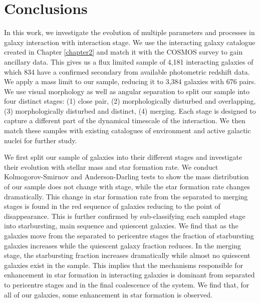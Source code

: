\section{Conclusions}\label{conclusion}
\noindent In this work, we investigate the evolution of multiple parameters and processes in galaxy interaction with interaction stage. We use the interacting galaxy catalogue created in Chapter \ref{chapter2} and match it with the COSMOS survey to gain ancillary data. This gives us a flux limited sample of 4,181 interacting galaxies of which 834 have a confirmed secondary from available photometric redshift data. We apply a mass limit to our sample, reducing it to 3,384 galaxies with 676 pairs. We use visual morphology as well as angular separation to split our sample into four distinct stages: (1) close pair, (2) morphologically disturbed and overlapping, (3) morphologically disturbed and distinct, (4) merging. Each stage is designed to capture a different part of the dynamical timescale of the interaction. We then match these samples with existing catalogues of environment and active galactic nuclei for further study.

We first split our sample of galaxies into their different stages and investigate their evolution with stellar mass and star formation rate. We conduct Kolmogorov-Smirnov and Anderson-Darling tests to show the mass distribution of our sample does not change with stage, while the star formation rate changes dramatically. This change in star formation rate from the separated to merging stages is found in the red sequence of galaxies reducing to the point of disappearance. This is further confirmed by sub-classifying each sampled stage into starbursting, main sequence and quiescent galaxies. We find that as the galaxies move from the separated to pericentre stages the fraction of starbursting galaxies increases while the quiescent galaxy fraction reduces. In the merging stage, the starbursting fraction increases dramatically while almost no quiescent galaxies exist in the sample. This implies that the mechanisms responsible for enhancement in star formation in interacting galaxies is dominant from separated to pericentre stages and in the final coalescence of the system. We find that, for all of our galaxies, some enhancement in star formation is observed. 

